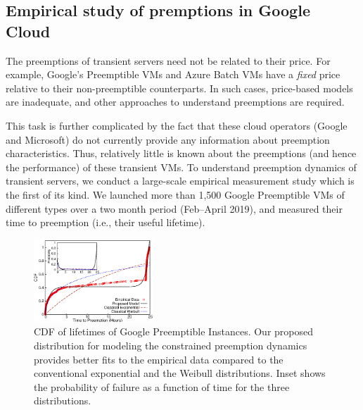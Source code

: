 \subsection{Empirical study of premptions in Google Cloud}

The preemptions of transient servers need not be related to their price.
For example, Google's Preemptible VMs and Azure Batch VMs have a \emph{fixed} price relative to their non-preemptible counterparts. 
In such cases, price-based models are inadequate, and other approaches to understand preemptions are required.

This task is further complicated by the fact that these cloud operators (Google and Microsoft) do not currently provide any information about preemption characteristics. 
Thus, relatively little is known about the preemptions (and hence the performance) of these transient VMs. %
%
To understand preemption dynamics of transient servers, we conduct a large-scale empirical measurement study which is the first of its kind. 
We launched more than 1,500 Google Preemptible VMs of different types over a two month period (Feb--April 2019), and measured their time to preemption (i.e., their useful lifetime).\footnotemark



\begin{figure}
  \centering
  \includegraphics[width=0.4\textwidth]{../graphs/scispot-fig-cdf-prob-inset-time.eps}
  \caption{CDF of lifetimes of Google Preemptible Instances. Our proposed distribution for modeling the constrained preemption dynamics provides better fits to the empirical data compared to the conventional exponential and the Weibull distributions. Inset shows the probability of failure as a function of time for the three distributions.}
  \label{fig:gcp1}
\end{figure}

